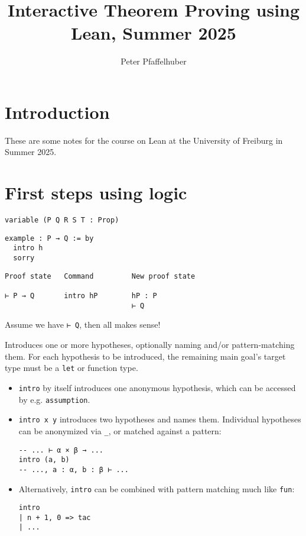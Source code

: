 \documentclass{memoir}
\title{\sffamily Interactive Theorem Proving using Lean, Summer 2025}
\author{\sffamily Peter Pfaffelhuber}
\date{\sffamily }
\begin{document}
\frontmatter

\begin{titlingpage}
\maketitle
\end{titlingpage}

\tableofcontents

\mainmatter

\chapter*{Introduction}
These are some notes for the course on Lean at the University of Freiburg in Summer 2025.
\chapter{First steps using logic}

\begin{verbatim}
variable (P Q R S T : Prop)

\end{verbatim}



\begin{verbatim}
example : P → Q := by
  intro h
  sorry

\end{verbatim}



\begin{verbatim}
Proof state   Command         New proof state

⊢ P → Q       intro hP        hP : P
                              ⊢ Q

\end{verbatim}


Assume we have \verb|⊢ Q|, then all makes sense!

Introduces one or more hypotheses, optionally naming and/or pattern-matching them.
For each hypothesis to be introduced, the remaining main goal's target type must
be a \verb|let| or function type.\begin{itemize}
\item \verb|intro| by itself introduces one anonymous hypothesis, which can be accessed
by e.g. \verb|assumption|.\item \verb|intro x y| introduces two hypotheses and names them. Individual hypotheses
can be anonymized via \verb|_|, or matched against a pattern:\begin{verbatim}
-- ... ⊢ α × β → ...
intro (a, b)
-- ..., a : α, b : β ⊢ ...

\end{verbatim}
\item Alternatively, \verb|intro| can be combined with pattern matching much like \verb|fun|:\begin{verbatim}
intro
| n + 1, 0 => tac
| ...

\end{verbatim}

\end{itemize}
\end{document}
